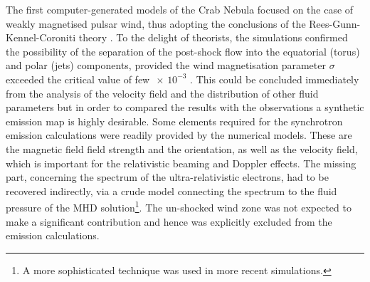 The first computer-generated models of the Crab Nebula focused on the case of weakly magnetised pulsar wind, thus adopting the conclusions of the Rees-Gunn-Kennel-Coroniti theory \citep{rees-gunn-74,kc84a,kc84b}.  To the delight of theorists, the simulations confirmed the possibility of the separation of the post-shock flow into the equatorial (torus)  and polar (jets) components, provided the wind magnetisation parameter $\sigma$ exceeded the critical value of few $\,\times\, 10^{-3}$ \citep{ssk-lyub-03,ssk-lyub-04,delzanna-04,bogovalov-05}.  This could be concluded immediately from the analysis of the velocity field and the distribution of other fluid parameters but in order to compared the results with the observations a synthetic emission map is highly desirable. Some elements required for the synchrotron emission calculations were readily provided by the numerical models. These are the magnetic field field strength and the orientation, as well as the velocity field, which is important for the relativistic beaming and Doppler effects.   The missing part, concerning the spectrum of the ultra-relativistic electrons, had to be recovered indirectly, via a crude model connecting the spectrum to the fluid pressure of the MHD solution\footnote{A more sophisticated technique was used in more recent simulations. }.  The un-shocked wind zone was not expected to make a significant contribution and hence was explicitly excluded from the emission calculations.
